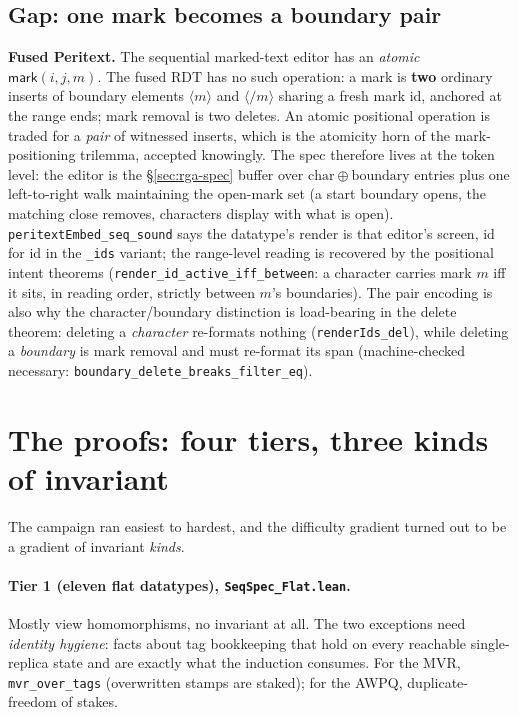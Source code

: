 \documentclass[11pt]{article}
\newcommand{\code}[1]{\texttt{#1}}
\begin{document}
\subsection{Gap: one mark becomes a boundary pair}

\textbf{Fused Peritext.} The sequential marked-text editor has an
\emph{atomic} $\mathsf{mark}(i, j, m)$. The fused RDT has no such
operation: a mark is \textbf{two} ordinary inserts of boundary
elements $\langle m\rangle$ and $\langle/m\rangle$ sharing a fresh
mark id, anchored at the range ends; mark removal is two deletes. An
atomic positional operation is traded for a \emph{pair} of witnessed
inserts, which is the atomicity horn of the mark-positioning trilemma,
accepted knowingly. The spec therefore lives at the token level: the
editor is the \S\ref{sec:rga-spec} buffer over
$\mathrm{char} \oplus \mathrm{boundary}$ entries plus one
left-to-right walk maintaining the open-mark set (a start boundary
opens, the matching close removes, characters display with what is
open). \code{peritextEmbed\_seq\_sound} says the datatype's render is
that editor's screen, id for id in the \code{\_ids} variant; the
range-level reading is recovered by the positional intent theorems
(\code{render\_id\_active\_iff\_between}: a character carries mark $m$
iff it sits, in reading order, strictly between $m$'s boundaries).
The pair encoding is also why the character/boundary distinction is
load-bearing in the delete theorem: deleting a \emph{character}
re-formats nothing (\code{renderIds\_del}), while deleting a
\emph{boundary} is mark removal and must re-format its span
(machine-checked necessary: \code{boundary\_delete\_breaks\_filter\_eq}).

\section{The proofs: four tiers, three kinds of invariant}
\label{sec:tiers}

The campaign ran easiest to hardest, and the difficulty gradient
turned out to be a gradient of invariant \emph{kinds}.

\paragraph{Tier 1 (eleven flat datatypes), \code{SeqSpec\_Flat.lean}.}
Mostly view homomorphisms, no invariant at all. The two exceptions
need \emph{identity hygiene}: facts about tag bookkeeping that hold on
every reachable single-replica state and are exactly what the
induction consumes. For the MVR, \code{mvr\_over\_tags} (overwritten
stamps are staked); for the AWPQ, duplicate-freedom of stakes.
\end{document}
